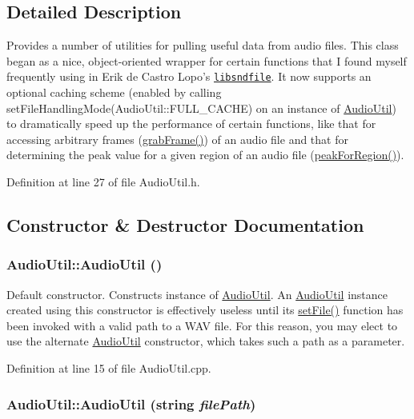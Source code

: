 \subsection{Detailed Description}
Provides a number of utilities for pulling useful data from audio files. This class began as a nice, object-\/oriented wrapper for certain functions that I found myself frequently using in Erik de Castro Lopo's \href{http://www.mega-nerd.com/libsndfile/}{\tt libsndfile}. It now supports an optional caching scheme (enabled by calling setFileHandlingMode(AudioUtil::FULL\_\-CACHE) on an instance of \hyperlink{classAudioUtil}{AudioUtil}) to dramatically speed up the performance of certain functions, like that for accessing arbitrary frames (\hyperlink{classAudioUtil_a6aa717262c503b4c6b238fdebdc1d1ca}{grabFrame()}) of an audio file and that for determining the peak value for a given region of an audio file (\hyperlink{classAudioUtil_ac32f8bd852e56ada63ea24fa666c08db}{peakForRegion()}). 

Definition at line 27 of file AudioUtil.h.

\subsection{Constructor \& Destructor Documentation}
\hypertarget{classAudioUtil_a6d030f910af2f43c606be1bee03ed18e}{
\subsubsection[{AudioUtil}]{\setlength{\rightskip}{0pt plus 5cm}AudioUtil::AudioUtil ()}}
\label{classAudioUtil_a6d030f910af2f43c606be1bee03ed18e}


Default constructor. Constructs instance of \hyperlink{classAudioUtil}{AudioUtil}. An \hyperlink{classAudioUtil}{AudioUtil} instance created using this constructor is effectively useless until its \hyperlink{classAudioUtil_a5f477f4385a0da16f930d627dc168723}{setFile()} function has been invoked with a valid path to a WAV file. For this reason, you may elect to use the alternate \hyperlink{classAudioUtil}{AudioUtil} constructor, which takes such a path as a parameter. 

Definition at line 15 of file AudioUtil.cpp.\hypertarget{classAudioUtil_a8c8a360f57a0fe1ab48b8571e4ff609b}{
\subsubsection[{AudioUtil}]{\setlength{\rightskip}{0pt plus 5cm}AudioUtil::AudioUtil (string {\em filePath})}}
\label{classAudioUtil_a8c8a360f57a0fe1ab48b8571e4ff609b}


